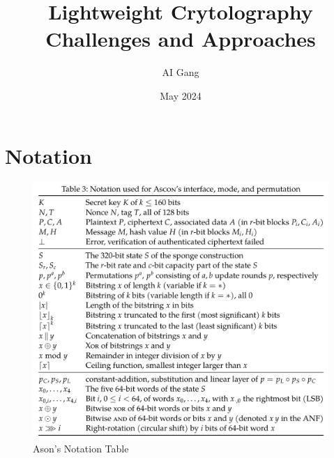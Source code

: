 \documentclass{article}
\title{Lightweight Crytolography Challenges and Approaches}
\author{AI Gang}
\date{May 2024}
\begin{document}
\maketitle
\tableofcontents



\section{Notation}
\begin{figure}[H] 
    \centering 
    \includegraphics[width=1\textwidth]{figures/ascon-notation.png}
    \caption{Ason's Notation Table \cite{Ascon-v1.2}}
    \label{fig:ascon-notation} 
  \end{figure}




\end{document}
